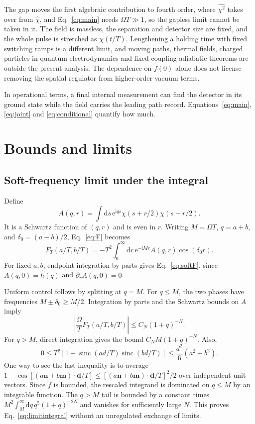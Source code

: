 \documentclass[11pt,a4paper]{article}
\newcommand{\dd}{\mathrm{d}}
\newcommand{\ii}{\mathrm{i}}
\newcommand{\ee}{\mathrm{e}}
\newcommand{\sinc}{\operatorname{sinc}}
\begin{document}
The gap moves the first algebraic contribution to fourth order, where $\widehat{\chi^2}$ takes over from $\widehat\chi$, and Eq.~\eqref{eq:main} needs $\Omega T\gg1$, so the gapless limit cannot be taken in it. The field is massless, the separation and detector size are fixed, and the whole pulse is stretched as $\chi(t/T)$. Lengthening a holding time with fixed switching ramps is a different limit, and moving paths, thermal fields, charged particles in quantum electrodynamics and fixed-coupling adiabatic theorems are outside the present analysis. The dependence on $\widetilde f(0)$ alone does not license removing the spatial regulator from higher-order vacuum terms.

In operational terms, a final internal measurement can find the detector in its ground state while the field carries the leading path record. Equations~\eqref{eq:main}, \eqref{eq:joint} and \eqref{eq:conditional} quantify how much.

\appendix
\section{Bounds and limits}\label{app:bounds}

\subsection{Soft-frequency limit under the integral}

Define
\begin{equation}
 A(q,r)=\int\dd s\,\ee^{\ii qs}\chi(s+r/2)\chi(s-r/2).
\end{equation}
It is a Schwartz function of $(q,r)$ and is even in $r$. Writing $M=\Omega T$, $q=a+b$, and $\delta_0=(a-b)/2$, Eq.~\eqref{eq:F} becomes
\begin{equation}
 F_T(a/T,b/T)=-T^2\int_0^{\infty}\dd r\,
 \ee^{-\ii Mr}A(q,r)\cos(\delta_0r).\label{eq:rescaledF}
\end{equation}
For fixed $a,b$, endpoint integration by parts gives Eq.~\eqref{eq:softF}, since $A(q,0)=\widehat h(q)$ and $\partial_r A(q,0)=0$.

Uniform control follows by splitting at $q=M$. For $q\leq M$, the two phases have frequencies $M\pm\delta_0\geq M/2$. Integration by parts and the Schwartz bounds on $A$ imply
\begin{equation}
 \left|\frac{\Omega}{T}F_T(a/T,b/T)\right|
 \leq C_N(1+q)^{-N}.
\end{equation}
For $q>M$, direct integration gives the bound $C_NM(1+q)^{-N}$. Also,
\begin{equation}
 0\leq T^2[1-\sinc(ad/T)\sinc(bd/T)]
 \leq\frac{d^2}{6}(a^2+b^2).
\end{equation}
One way to see the last inequality is to average
$1-\cos[(a\bm n+b\bm m)\cdot\bm d/T]\leq[(a\bm n+b\bm m)\cdot\bm d/T]^2/2$
over independent unit vectors. Since $\widetilde f$ is bounded, the rescaled integrand is dominated on $q\leq M$ by an integrable function. The $q>M$ tail is bounded by a constant times $M^2\int_M^{\infty}\dd q\,q^5(1+q)^{-2N}$ and vanishes for sufficiently large $N$. This proves Eq.~\eqref{eq:limitintegral} without an unregulated exchange of limits.
\end{document}

